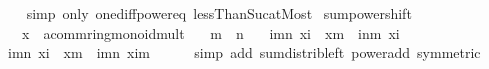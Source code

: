 \begin{isabellebody}
\ \ %
\endisadelimproof
%
\isatagproof
{}\isamarkupfalse%
\ {\isacharparenleft}{\kern0pt}simp\ only{\isacharcolon}{\kern0pt}\ one{\isacharunderscore}{\kern0pt}diff{\isacharunderscore}{\kern0pt}power{\isacharunderscore}{\kern0pt}eq\ lessThan{\isacharunderscore}{\kern0pt}Suc{\isacharunderscore}{\kern0pt}atMost{\isacharparenright}{\kern0pt}%
\endisatagproof
{\isafoldproof}%
%
\isadelimproof
\isanewline
%
\endisadelimproof
\isanewline
{}\isamarkupfalse%
\ sum{\isacharunderscore}{\kern0pt}power{\isacharunderscore}{\kern0pt}shift{\isacharcolon}{\kern0pt}\isanewline
\ \ \ x\ {\isacharcolon}{\kern0pt}{\isacharcolon}{\kern0pt}\ {\isachardoublequoteopen}{\isacharprime}{\kern0pt}a{\isacharcolon}{\kern0pt}{\isacharcolon}{\kern0pt}{\isacharbraceleft}{\kern0pt}comm{\isacharunderscore}{\kern0pt}ring{\isacharcomma}{\kern0pt}monoid{\isacharunderscore}{\kern0pt}mult{\isacharbraceright}{\kern0pt}{\isachardoublequoteclose}\isanewline
\ \ \ {\isachardoublequoteopen}m\ {\isasymle}\ n{\isachardoublequoteclose}\isanewline
\ \ \ {\isachardoublequoteopen}{\isacharparenleft}{\kern0pt}{\isasymSum}i{\isacharequal}{\kern0pt}m{\isachardot}{\kern0pt}{\isachardot}{\kern0pt}n{\isachardot}{\kern0pt}\ x{\isacharcircum}{\kern0pt}i{\isacharparenright}{\kern0pt}\ {\isacharequal}{\kern0pt}\ x{\isacharcircum}{\kern0pt}m\ {\isacharasterisk}{\kern0pt}\ {\isacharparenleft}{\kern0pt}{\isasymSum}i{\isasymle}n{\isacharminus}{\kern0pt}m{\isachardot}{\kern0pt}\ x{\isacharcircum}{\kern0pt}i{\isacharparenright}{\kern0pt}{\isachardoublequoteclose}\isanewline
%
\isadelimproof
%
\endisadelimproof
%
\isatagproof
{}\isamarkupfalse%
\ {\isacharminus}{\kern0pt}\isanewline
\ \ \isamarkupfalse%
\ {\isachardoublequoteopen}{\isacharparenleft}{\kern0pt}{\isasymSum}i{\isacharequal}{\kern0pt}m{\isachardot}{\kern0pt}{\isachardot}{\kern0pt}n{\isachardot}{\kern0pt}\ x{\isacharcircum}{\kern0pt}i{\isacharparenright}{\kern0pt}\ {\isacharequal}{\kern0pt}\ x{\isacharcircum}{\kern0pt}m\ {\isacharasterisk}{\kern0pt}\ {\isacharparenleft}{\kern0pt}{\isasymSum}i{\isacharequal}{\kern0pt}m{\isachardot}{\kern0pt}{\isachardot}{\kern0pt}n{\isachardot}{\kern0pt}\ x{\isacharcircum}{\kern0pt}{\isacharparenleft}{\kern0pt}i{\isacharminus}{\kern0pt}m{\isacharparenright}{\kern0pt}{\isacharparenright}{\kern0pt}{\isachardoublequoteclose}\isanewline
\ \ \ \ \isamarkupfalse%
\ {\isacharparenleft}{\kern0pt}simp\ add{\isacharcolon}{\kern0pt}\ sum{\isacharunderscore}{\kern0pt}distrib{\isacharunderscore}{\kern0pt}left\ power{\isacharunderscore}{\kern0pt}add\ {\isacharbrackleft}{\kern0pt}symmetric{\isacharbrackright}{\kern0pt}{\isacharparenright}{\kern0pt}\isanewline

\end{isabellebody}
